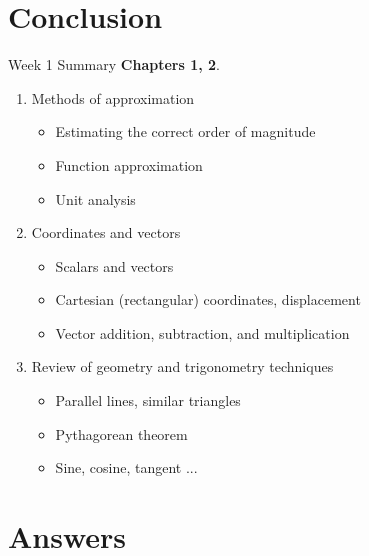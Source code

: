\documentclass{beamer}
\begin{document}
\section{Conclusion}

\begin{frame}{Week 1 Summary}
\textbf{Chapters 1, 2}.
\begin{enumerate}
\item Methods of approximation
\begin{itemize}
\item \alert{Estimating} the correct order of magnitude
\item \alert{Function} approximation
\item \alert{Unit analysis}
\end{itemize}
\item Coordinates and vectors
\begin{itemize}
\item \alert{Scalars} and \alert{vectors}
\item \alert{Cartesian} (rectangular) coordinates, displacement
\item \alert{Vector} addition, subtraction, and multiplication
\end{itemize}
\item Review of geometry and trigonometry techniques
\begin{itemize}
\item Parallel lines, similar triangles
\item Pythagorean theorem
\item Sine, cosine, tangent ...
\end{itemize}
\end{enumerate}
\end{frame}

\section{Answers}
\end{document}
